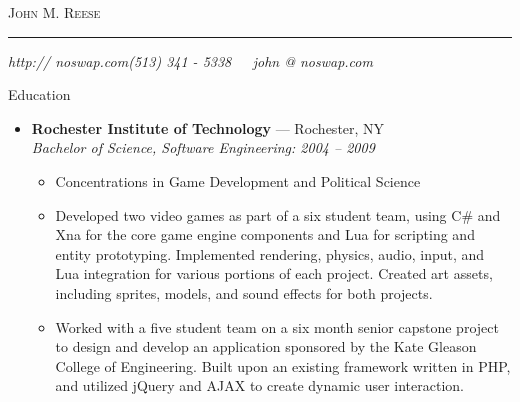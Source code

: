\documentclass[11pt,oneside]{article}
\makeatletter
\newcommand{\name}{John M. Reese}
\newcommand{\phone}{(513) 341 - 5338}
\newcommand{\email}{john @ noswap.com}
\newcommand{\website}{http:// noswap.com}
\newcommand{\bigname}[1]{
    \begin{center}\fontfamily{ppl}\selectfont\Huge\scshape#1\end{center}
}
\newenvironment{ressection}[1]{
    \vspace{8pt}
    {\fontfamily{phv}\selectfont\Large#1}
    \begin{itemize}
    \vspace{3pt}
}{
    \end{itemize}
}
\newcommand{\ressubitem}[1]{
    \vspace{-1pt}
    \item \begin{flushleft} #1 \end{flushleft}
}
\newcommand{\resbigitem}[3]{
    \vspace{-5pt}
    \item
    \textbf{#1} --- #2 \\
    \textit{#3}
}
\newenvironment{ressubsec}[3]{
    \resbigitem{#1}{#2}{#3}
    \vspace{-2pt}
    \begin{itemize}
}{
    \end{itemize}
}
\makeatother
\begin{document}
 \selectfont

\bigname{\name}

\vspace{-8pt} \rule{\textwidth}{1pt}

\vspace{-1pt} {\small\itshape \website \hfill \phone \ \ \ \email}

\vspace{8 pt}




\begin{ressection}{Education}

    \begin{ressubsec}{Rochester Institute of Technology}{Rochester, NY}
    {Bachelor of Science, Software Engineering:  2004 -- 2009}
        \ressubitem{Concentrations in Game Development and Political Science}
        \ressubitem{Developed two video games as part of a six student team, using C\# and Xna for
        the core game engine components and Lua for scripting and entity prototyping.  Implemented
        rendering, physics, audio, input, and Lua integration for various portions of each project.
        Created art assets, including sprites, models, and sound effects for both projects.}
        \ressubitem{Worked with a five student team on a six month senior capstone project
        to design and develop an application sponsored by the Kate Gleason College of Engineering.
        Built upon an existing framework written in PHP, and utilized jQuery and AJAX to create
        dynamic user interaction.}
    \end{ressubsec}

\end{ressection}
\end{document}
